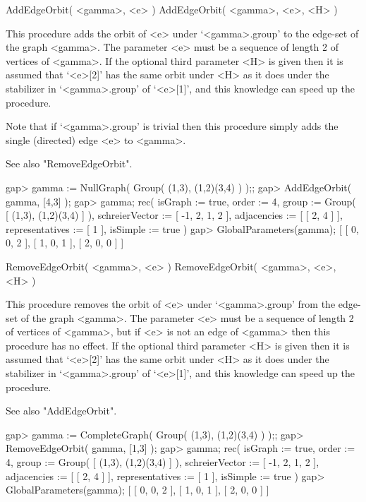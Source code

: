 \>AddEdgeOrbit( <gamma>, <e> )
\>AddEdgeOrbit( <gamma>, <e>, <H> )

This procedure adds the orbit of <e> under `<gamma>.group' to the
edge-set of the graph <gamma>. The parameter <e> must be a sequence of
length 2 of vertices of <gamma>. If the optional third parameter <H> is
given then it is assumed that `<e>[2]' has the same orbit under <H> as
it does under the stabilizer in `<gamma>.group' of `<e>[1]', and this
knowledge can speed up the procedure.

Note that if `<gamma>.group' is trivial then this procedure simply adds the
single (directed) edge <e> to <gamma>.

See also "RemoveEdgeOrbit".

\beginexample
gap> gamma := NullGraph( Group( (1,3), (1,2)(3,4) ) );;
gap> AddEdgeOrbit( gamma, [4,3] );
gap> gamma;
rec(
  isGraph := true,
  order := 4,
  group := Group( [ (1,3), (1,2)(3,4) ] ),
  schreierVector := [ -1, 2, 1, 2 ],
  adjacencies := [ [ 2, 4 ] ],
  representatives := [ 1 ],
  isSimple := true )
gap> GlobalParameters(gamma);
[ [ 0, 0, 2 ], [ 1, 0, 1 ], [ 2, 0, 0 ] ]
\endexample


\>RemoveEdgeOrbit( <gamma>, <e> )
\>RemoveEdgeOrbit( <gamma>, <e>, <H> )

This procedure removes the orbit of <e> under `<gamma>.group' from the
edge-set of the graph <gamma>. The parameter <e> must be a sequence of
length 2 of vertices of <gamma>, but if <e> is not an edge of <gamma>
then this procedure has no effect. If the optional third parameter <H>
is given then it is assumed that `<e>[2]' has the same orbit under <H>
as it does under the stabilizer in `<gamma>.group' of `<e>[1]', and
this knowledge can speed up the procedure.

See also "AddEdgeOrbit".

\beginexample
gap> gamma := CompleteGraph( Group( (1,3), (1,2)(3,4) ) );;
gap> RemoveEdgeOrbit( gamma, [1,3] );
gap> gamma;
rec(
  isGraph := true,
  order := 4,
  group := Group( [ (1,3), (1,2)(3,4) ] ),
  schreierVector := [ -1, 2, 1, 2 ],
  adjacencies := [ [ 2, 4 ] ],
  representatives := [ 1 ],
  isSimple := true )
gap> GlobalParameters(gamma);
[ [ 0, 0, 2 ], [ 1, 0, 1 ], [ 2, 0, 0 ] ]
\endexample


